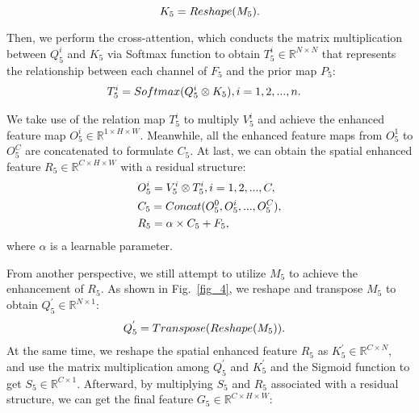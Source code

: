 \documentclass[lettersize,journal]{IEEEtran}
\begin{document}
\begin{equation}
\centering
\label{equ3} 
    K_{5} = Reshape(M_{5}).
\end{equation}
\par
Then, we perform the cross-attention, which conducts the matrix multiplication between $Q_{5}^{i}$ and $K_{5}$ via Softmax function to obtain $T_{5}^{i} \in  {\mathbb{R}}^ {N\times N}$ that represents the relationship between each channel of $F_{5}$ and the prior map $P_5$:
\begin{equation}
\centering
\label{equ4} 
\begin{split}
    &T_{5}^{i} = Softmax(Q_{5}^{i}\otimes K_{5}), i=1,2,...,n.
\end{split}
\end{equation}
\par
We take use of the relation map $T_{5}^{i}$ to multiply $V_{5}^{i}$ and achieve the enhanced feature map $O_{5}^{i} \in {\mathbb{R}}^ {1\times H\times W}$. Meanwhile, all the enhanced feature maps from $O_{5}^{1}$ to $O_{5}^{C}$ are concatenated to formulate $C_{5}$. At last, we can obtain the spatial enhanced feature $R_{5} \in {\mathbb{R}}^ {C\times H\times W}$ with a residual structure:
\begin{equation}
\centering
\label{equ5} 
\begin{split}
    &O_{5}^{i} = V_{5}^{i}\otimes T_{5}^{i}, i=1,2,...,C, \\
    &C_{5} = Concat(O_{5}^{0},O_{5}^{i},...,O_{5}^{C}), \\
    &R_{5} = \alpha \times C_{5} + F_{5},
\end{split}
\end{equation}
where $\alpha$ is a learnable parameter.
\par
From another perspective, we still attempt to utilize $M_{5}$ to achieve the enhancement of $R_5$. As shown in Fig.~\ref{fig_4}, we reshape and transpose $M_{5}$ to obtain $Q_{5}^{'} \in  {\mathbb{R}}^ {N\times 1}$:
\begin{equation}
\centering
\label{equ6} 
\begin{split}
    &Q_{5}^{'} = Transpose(Reshape(M_{5})).
\end{split}
\end{equation}
At the same time, we reshape the spatial enhanced feature $R_{5}$ as $K_{5}^{'} \in  {\mathbb{R}}^ {C\times N}$, and use the matrix multiplication among $Q_{5}^{'}$ and $K_{5}^{'}$ and the Sigmoid function to get $S_{5} \in  {\mathbb{R}}^ {C\times 1}$. Afterward, by multiplying $S_{5}$ and $R_{5}$ associated with a residual structure, we can get the final feature $G_{5} \in  {\mathbb{R}}^ {C\times H \times W}$:
\end{document}
